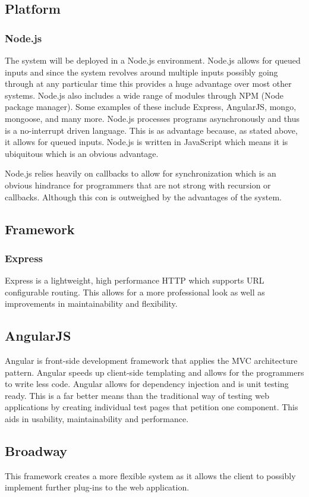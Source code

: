 \subsection{Platform}
\subsubsection{Node.js}
The system will be deployed in a Node.js environment. Node.js allows for queued inputs and since the system revolves around multiple inputs possibly going through at any particular time this provides a huge advantage over most other systems. Node.js also includes a wide range of modules through NPM (Node package manager). Some examples of these include Express, AngularJS, mongo, mongoose, and many more. Node.js processes programs asynchronously and thus is a no-interrupt driven language. This is as advantage because, as stated above, it allows for queued inputs. Node.js is written in JavaScript which means it is ubiquitous which is an obvious advantage.

Node.js relies heavily on callbacks to allow for synchronization which is an obvious hindrance for programmers that are not strong with recursion or callbacks. Although this con is outweighed by the advantages of the system.

\subsection{Framework}
\subsubsection{Express}
Express is a lightweight, high performance HTTP which supports URL configurable routing. This allows for a more professional look as well as improvements in maintainability and flexibility.
\subsection{AngularJS}
Angular is front-side development framework that applies the MVC architecture pattern. Angular speeds up client-side templating and allows for the programmers to write less code. Angular allows for dependency injection and is unit testing ready. This is a far better means than the traditional way of testing web applications by creating individual test pages that petition one component. This aids in usability, maintainability and performance.
\subsection{Broadway}
This framework creates a more flexible system as it allows the client to possibly implement further plug-ins to the web application.
